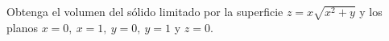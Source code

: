 \item Obtenga el volumen del sólido limitado por la superficie $z = x\sqrt{x^2 + y}$ y los planos $x = 0, \ x = 1, \ y = 0, \ y = 1$ y $z = 0$.
